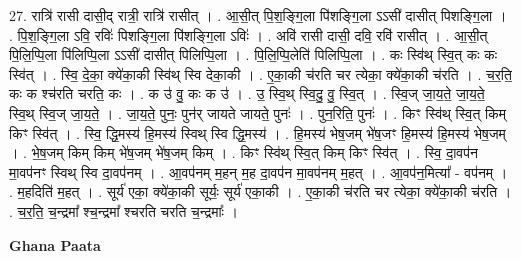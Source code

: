 \documentclass[17pt]{extarticle}
\begin{document}
27. रात्रि॑ रासी दासी॒द् रात्री॒ रात्रि॑ रासीत् । . आ॒सी॒त् पि॒श॒ङ्गि॒ला पि॑शङ्गि॒ला ऽऽसी॑ दासीत् पिशङ्गि॒ला । . पि॒श॒ङ्गि॒ला ऽवि॒ रविः॑ पिशङ्गि॒ला पि॑शङ्गि॒ला ऽविः॑ । . अवि॑ रासी दासी॒ दवि॒ रवि॑ रासीत् । . आ॒सी॒त् पि॒लि॒प्पि॒ला पि॑लिप्पि॒ला ऽऽसी॑ दासीत् पिलिप्पि॒ला । . पि॒लि॒प्पि॒लेति॑ पिलिप्पि॒ला । . कः स्वि॑थ् स्वि॒त् कः कः स्वि॑त् । . स्वि॒ दे॒का॒ क्ये॑का॒की स्वि॑थ् स्वि देका॒की । . ए॒का॒की च॑रति चर त्येका॒ क्ये॑का॒की च॑रति । . च॒र॒ति॒ कः क श्च॑रति चरति॒ कः । . क उ॑ वु॒ कः क उ॑ । . उ॒ स्वि॒थ् स्वि॒दु॒ वु॒ स्वि॒त् । . स्वि॒ज् जा॒य॒ते॒ जा॒य॒ते॒ स्वि॒थ् स्वि॒ज् जा॒य॒ते॒ । . जा॒य॒ते॒ पुनः॒ पुन॑र् जायते जायते॒ पुनः॑ । . पुन॒रिति॒ पुनः॑ । . किꣳ स्वि॑थ् स्वि॒त् किम् किꣳ स्वि॑त् । . स्वि॒ द्धि॒मस्य॑ हि॒मस्य॑ स्विथ् स्वि द्धि॒मस्य॑ । . हि॒मस्य॑ भेष॒जम् भे॑ष॒जꣳ हि॒मस्य॑ हि॒मस्य॑ भेष॒जम् । . भे॒ष॒जम् किम् किम् भे॑ष॒जम् भे॑ष॒जम् किम् । . किꣳ स्वि॑थ् स्वि॒त् किम् किꣳ स्वि॑त् । . स्वि॒ दा॒वप॑न मा॒वप॑नꣳ स्विथ् स्वि दा॒वप॑नम् । . आ॒वप॑नम् म॒हन् म॒ह दा॒वप॑न मा॒वप॑नम् म॒हत् । . आ॒वप॑न॒मित्या᳚ - वप॑नम् । . म॒हदिति॑ म॒हत् । . सूर्य॑ एका॒ क्ये॑का॒की सूर्यः॒ सूर्य॑ एका॒की । . ए॒का॒की च॑रति चर त्येका॒ क्ये॑का॒की च॑रति । . च॒र॒ति॒ च॒न्द्रमा᳚ श्च॒न्द्रमा᳚ श्चरति चरति च॒न्द्रमाः᳚ । \newline

\textbf{Ghana Paata } \newline
\end{document}
